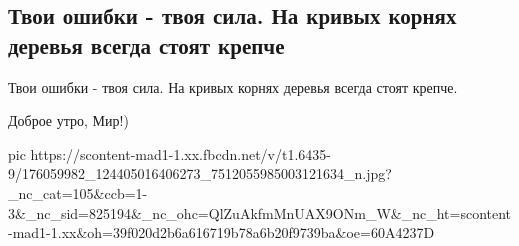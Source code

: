  
 
 
 
 

\subsection{Твои ошибки - твоя сила. На кривых корнях деревья всегда стоят крепче}

Твои ошибки - твоя сила. На кривых корнях деревья всегда стоят крепче.

Доброе утро, Мир!)


\ifcmt
  pic https://scontent-mad1-1.xx.fbcdn.net/v/t1.6435-9/176059982_124405016406273_7512055985003121634_n.jpg?_nc_cat=105&ccb=1-3&_nc_sid=825194&_nc_ohc=QlZuAkfmMnUAX9ONm_W&_nc_ht=scontent-mad1-1.xx&oh=39f020d2b6a616719b78a6b20f9739ba&oe=60A4237D
\fi

